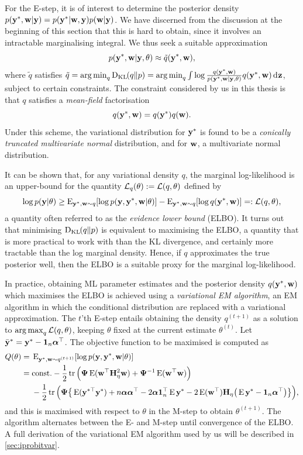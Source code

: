For the E-step, it is of interest to determine the posterior density $p({\mathbf y}^*,{\mathbf w}|{\mathbf y}) = p({\mathbf y}^*|{\mathbf w},{\mathbf y})p({\mathbf w}|{\mathbf y})$. 
We have discerned from the discussion at the beginning of this section that this is hard to obtain, since it involves an intractable marginalising integral.
We thus seek a suitable approximation
\[
  p({\mathbf y}^*,{\mathbf w} | {\mathbf y}, \theta) \approx \tilde q({\mathbf y}^*,{\mathbf w}),
\]
where $\tilde q$ satisfies $\tilde q = \operatorname*{arg\,min}_q \operatorname{D_{KL}\hspace{-1pt}}(q\Vert p) = \operatorname*{arg\,min}_q \int \log \frac{q({\mathbf y}^*,{\mathbf w})}{p({\mathbf y}^*,{\mathbf w} | {\mathbf y}, \theta)} q({\mathbf y}^*,{\mathbf w}) \operatorname{d}\hspace{0.5pt}\!{\mathbf z}$, subject to certain constraints.
The constraint considered by us in this thesis is that $q$ satisfies a \emph{mean-field} factorisation
\[
  q({\mathbf y}^*,{\mathbf w}) = q({\mathbf y}^*)q({\mathbf w}).
\]
Under this scheme, the variational distribution for ${\mathbf y}^*$ is found to be a \emph{conically truncated multivariate normal} distribution, and for ${\mathbf w}$, a multivariate normal distribution.

It can be shown that, for any variational density $q$, the marginal log-likelihood is an upper-bound for the quantity ${\mathcal L}_q(\theta) := {\mathcal L}(q,\theta)$ defined by
\[
  \log p({\mathbf y}|\theta) \geq 
    \operatorname{E}_{{\mathbf y}^*,{\mathbf w}\sim q} [\log p({\mathbf y},{\mathbf y}^*,{\mathbf w}|\theta)]
    - \operatorname{E}_{{\mathbf y}^*,{\mathbf w}\sim q} [ \log  q({\mathbf y}^*,{\mathbf w}) ] =: {\mathcal L}(q,\theta),
\]
a quantity often referred to as the \emph{evidence lower bound} (ELBO).
It turns out that minimising $\operatorname{D_{KL}\hspace{-1pt}}(q\Vert p)$ is equivalent to maximising the ELBO, a quantity that is more practical to work with than the KL divergence, and certainly more tractable than the log marginal density.
Hence, if $q$ approximates the true posterior well, then the ELBO is a suitable proxy for the marginal log-likelihood.

In practice, obtaining ML parameter estimates and the posterior density $q({\mathbf y}^*,{\mathbf w})$ which maximises the ELBO is achieved using a \emph{variational EM algorithm}, an EM algorithm in which the conditional distribution are replaced with a variational approximation.
The $t$'th E-step entails obtaining the density $q^{(t+1)}$ as a solution to $\operatorname*{arg\,max}_q {\mathcal L}(q,\theta)$, keeping $\theta$ fixed at the current estimate $\theta^{(t)}$.
Let $\bar{{\mathbf y}}^* = {\mathbf y}^* - {\mathbf 1}_n{\bm\alpha}^\top$.
The objective function to be maximised is computed as
\begin{align}
  Q(\theta) 
  ={}& \operatorname{E}_{{\mathbf y}^*,{\mathbf w}\sim q^{(t+1)}}  [ \log p({\mathbf y},{\mathbf y}^*,{\mathbf w}|\theta) ] \nonumber \\
  ={}& \text{const.}\hspace{0.01em} -\frac{1}{2}\operatorname{tr}\Big( {\bm\Psi} \operatorname{E}({\mathbf w}^\top{\mathbf H}_\eta^2{\mathbf w})  + {\bm\Psi}^{-1} \operatorname{E}({\mathbf w}^\top{\mathbf w}) \Big)  \nonumber \\
  &- \frac{1}{2} \operatorname{tr} \Big( 
  {\bm\Psi} \big\{
  \operatorname{E}({\mathbf y}^{*\top}{\mathbf y}^*)
  + n {\bm\alpha}{\bm\alpha}^\top 
  - 2{\bm\alpha} {\mathbf 1}_n^\top \operatorname{E} {\mathbf y}^*
  - 2\operatorname{E}({\mathbf w}^\top){\mathbf H}_\eta \big(\operatorname{E} {\mathbf y}^* - {\mathbf 1}_n{\bm\alpha}^\top \big) 
  \big\} \Big) \label{eq:iprobitQEstep}
  ,
\end{align}
and this is maximised with respect to $\theta$ in the M-step to obtain $\theta^{(t+1)}$.
The algorithm alternates between the E- and M-step until convergence of the ELBO.
A full derivation of the variational EM algorithm used by us will be described in \cref{sec:iprobitvar}.

